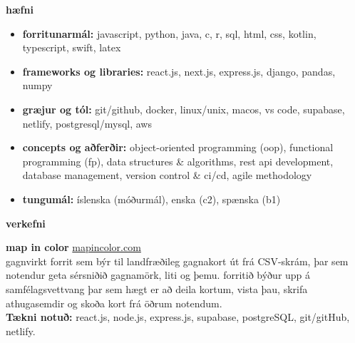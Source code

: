\documentclass[11pt]{article}
\newcommand{\cvsection}[1]{\vspace{2em}\textbf{\large #1}\par\vspace{1em}}
\begin{document}
\cvsection{hæfni}
\begin{itemize}
  \item \textbf{forritunarmál:} javascript, python, java, c, r, sql, html, css, kotlin, typescript, swift, latex
  \item \textbf{frameworks og libraries:} react.js, next.js, express.js, django, pandas, numpy
  \item \textbf{græjur og tól:} git/github, docker, linux/unix, macos, vs code, supabase, netlify, postgresql/mysql, aws
  \item \textbf{concepts og aðferðir:} object-oriented programming (oop), functional programming (fp), data structures \& algorithms, rest api development, database management, version control \& ci/cd, agile methodology
  \item \textbf{tungumál:} íslenska (móðurmál), enska (c2), spænska (b1)
\end{itemize}

\newpage

\cvsection{verkefni}
\textbf{map in color} \hfill \href{https://mapincolor.com}{mapincolor.com}\\
gagnvirkt forrit sem býr til landfræðileg gagnakort út frá CSV-skrám, þar sem notendur geta sérsniðið gagnamörk, liti og þemu. forritið býður upp á samfélagsvettvang þar sem hægt er að deila kortum, vista þau, skrifa athugasemdir og skoða kort frá öðrum notendum.\\
\textbf{Tækni notuð:} react.js, node.js, express.js, supabase, postgreSQL, git/gitHub, netlify.
\end{document}
